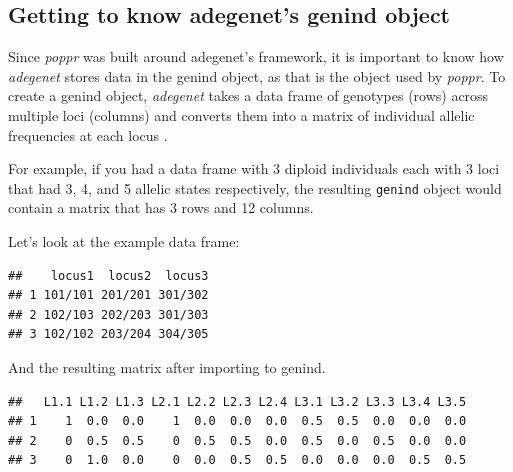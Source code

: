 \documentclass[letterpaper]{article}\usepackage[]{graphicx}\usepackage[]{color}
\makeatletter
\newenvironment{kframe}{%
 \def\at@end@of@kframe{}%
 \ifinner\ifhmode%
  \def\at@end@of@kframe{\end{minipage}}%
  \begin{minipage}{\columnwidth}%
 \fi\fi%
 \def\FrameCommand##1{\hskip\@totalleftmargin \hskip-\fboxsep
 \colorbox{shadecolor}{##1}\hskip-\fboxsep
     \hskip-\linewidth \hskip-\@totalleftmargin \hskip\columnwidth}%
 \MakeFramed {\advance\hsize-\width
   \@totalleftmargin\z@ \linewidth\hsize
   \@setminipage}}%
 {\par\unskip\endMakeFramed%
 \at@end@of@kframe}
\newenvironment{knitrout}{}{} %
\newcommand{\tab}{\hspace*{1em}}
\makeatother
\begin{document}
\subsection{Getting to know adegenet's genind object}\label{intro:genind}

\tab\tab Since \textit{poppr} was built around adegenet's framework, it is
important to know how \textit{adegenet} stores data in the genind object, as
that is the object used by \textit{poppr}. To create a genind object, 
\textit{adegenet} takes a data frame of genotypes (rows) across multiple loci
(columns) and converts them into a matrix of individual allelic frequencies at
each locus \cite{Jombart:2008}.

For example, if you had a data frame with 3 diploid individuals each with 3 loci
that had 3, 4, and 5 allelic states respectively, the resulting \texttt{genind}
object would contain a matrix that has 3 rows and 12 columns. 

\noindent Let's look at the example data frame:
\begin{knitrout}\footnotesize
{}\color{fgcolor}\begin{kframe}
\begin{verbatim}
##    locus1  locus2  locus3
## 1 101/101 201/201 301/302
## 2 102/103 202/203 301/303
## 3 102/102 203/204 304/305
\end{verbatim}
\end{kframe}
\end{knitrout}

And the resulting matrix after importing to genind.
\begin{knitrout}\footnotesize
{}\color{fgcolor}\begin{kframe}
\begin{verbatim}
##   L1.1 L1.2 L1.3 L2.1 L2.2 L2.3 L2.4 L3.1 L3.2 L3.3 L3.4 L3.5
## 1    1  0.0  0.0    1  0.0  0.0  0.0  0.5  0.5  0.0  0.0  0.0
## 2    0  0.5  0.5    0  0.5  0.5  0.0  0.5  0.0  0.5  0.0  0.0
## 3    0  1.0  0.0    0  0.0  0.5  0.5  0.0  0.0  0.0  0.5  0.5
\end{verbatim}
\end{kframe}
\end{knitrout}
\end{document}
